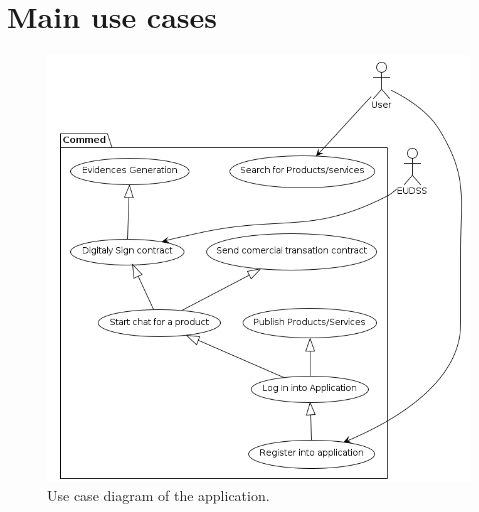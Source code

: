 \documentclass[./main.tex]{subfiles}
\begin{document}
\section{Main use cases}

\begin{figure}[h]
\centering
\includegraphics[width=\linewidth]{use_case_diagram/usecase_diagram.png} %
\caption{Use case diagram of the application.}
\end{figure}
\end{document}
